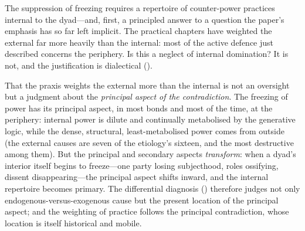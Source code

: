 The suppression of freezing requires a repertoire of counter-power practices internal to the dyad---and, first, a principled answer to a question the paper's emphasis has so far left implicit. The practical chapters have weighted the external far more heavily than the internal: most of the active defence just described concerns the periphery. Is this a neglect of internal domination? It is not, and the justification is dialectical ().

\begin{claim}
That the praxis weights the external more than the internal is not an oversight but a judgment about the \emph{principal aspect of the contradiction}. The freezing of power has its principal aspect, in most bonds and most of the time, at the periphery: internal power is dilute and continually metabolised by the generative logic, while the dense, structural, least-metabolised power comes from outside (the external causes are seven of the etiology's sixteen, and the most destructive among them). But the principal and secondary aspects \emph{transform}: when a dyad's interior itself begins to freeze---one party losing subjecthood, roles ossifying, dissent disappearing---the principal aspect shifts inward, and the internal repertoire becomes primary. The differential diagnosis () therefore judges not only endogenous-versus-exogenous cause but the present location of the principal aspect; and the weighting of practice follows the principal contradiction, whose location is itself historical and mobile.
\end{claim}

